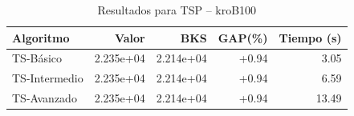\begin{table}[h]
\centering
\caption{Resultados para TSP -- kroB100}
\label{tab:tsp_kroB100}
\begin{tabular}{lrrrr}
\hline
\textbf{Algoritmo} & \textbf{Valor} & \textbf{BKS} & \textbf{GAP(\%)} & \textbf{Tiempo (s)} \\
\hline
TS-Básico & 2.235e+04 & 2.214e+04 & +0.94 & 3.05 \\
TS-Intermedio & 2.235e+04 & 2.214e+04 & +0.94 & 6.59 \\
TS-Avanzado & 2.235e+04 & 2.214e+04 & +0.94 & 13.49 \\
\hline
\end{tabular}
\end{table}
